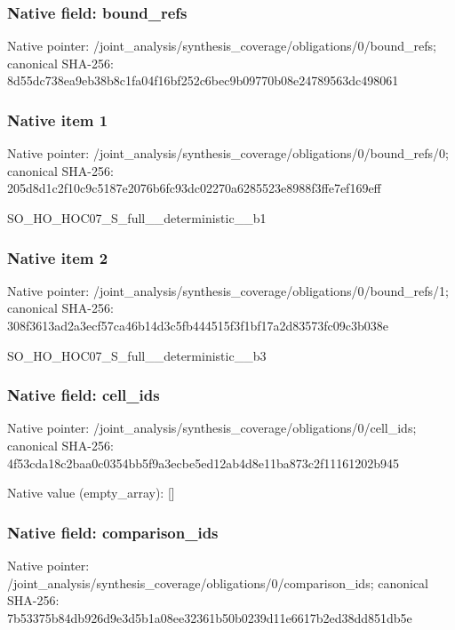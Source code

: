 \documentclass[10pt,a4paper]{article}
\begin{document}
\subsubsection{Native field: bound\_\allowbreak{}refs}
Native pointer: /joint\_\allowbreak{}analysis/synthesis\_\allowbreak{}coverage/obligations/0/bound\_\allowbreak{}refs; canonical SHA-256: 8d55dc738ea9eb38b8c1fa04f16bf252c6bec9b09770b08e24789563dc498061

\subsubsection{Native item 1}
Native pointer: /joint\_\allowbreak{}analysis/synthesis\_\allowbreak{}coverage/obligations/0/bound\_\allowbreak{}refs/0; canonical SHA-256: 205d8d1c2f10c9c5187e2076b6fc93dc02270a6285523e8988f3ffe7ef169eff

\begingroup\raggedright\sloppy SO\_\allowbreak{}HO\_\allowbreak{}HOC07\_\allowbreak{}S\_\allowbreak{}full\_\allowbreak{}\_\allowbreak{}deterministic\_\allowbreak{}\_\allowbreak{}b1\par\endgroup

\subsubsection{Native item 2}
Native pointer: /joint\_\allowbreak{}analysis/synthesis\_\allowbreak{}coverage/obligations/0/bound\_\allowbreak{}refs/1; canonical SHA-256: 308f3613ad2a3ecf57ca46b14d3c5fb444515f3f1bf17a2d83573fc09c3b038e

\begingroup\raggedright\sloppy SO\_\allowbreak{}HO\_\allowbreak{}HOC07\_\allowbreak{}S\_\allowbreak{}full\_\allowbreak{}\_\allowbreak{}deterministic\_\allowbreak{}\_\allowbreak{}b3\par\endgroup

\subsubsection{Native field: cell\_\allowbreak{}ids}
Native pointer: /joint\_\allowbreak{}analysis/synthesis\_\allowbreak{}coverage/obligations/0/cell\_\allowbreak{}ids; canonical SHA-256: 4f53cda18c2baa0c0354bb5f9a3ecbe5ed12ab4d8e11ba873c2f11161202b945

Native value (empty\_\allowbreak{}array): []

\subsubsection{Native field: comparison\_\allowbreak{}ids}
Native pointer: /joint\_\allowbreak{}analysis/synthesis\_\allowbreak{}coverage/obligations/0/comparison\_\allowbreak{}ids; canonical SHA-256: 7b53375b84db926d9e3d5b1a08ee32361b50b0239d11e6617b2ed38dd851db5e
\end{document}
